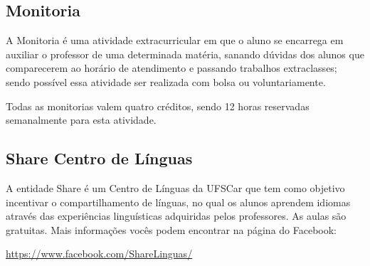 \subsection{Monitoria}
A Monitoria é uma atividade extracurricular em que o aluno se encarrega em auxiliar o professor de uma determinada matéria, sanando dúvidas dos alunos que comparecerem ao horário de atendimento e passando trabalhos extraclasses; sendo possível essa atividade ser realizada com bolsa ou voluntariamente.

Todas as monitorias valem quatro créditos, sendo 12 horas reservadas semanalmente para esta atividade.

\subsection{Share Centro de Línguas}
A entidade Share é um Centro de Línguas da UFSCar que tem como objetivo incentivar o compartilhamento de línguas, no qual os alunos aprendem idiomas através das experiências linguísticas adquiridas pelos professores. As aulas são gratuitas.
Mais informações vocês podem encontrar na página do Facebook:

\url{https://www.facebook.com/ShareLinguas/}
